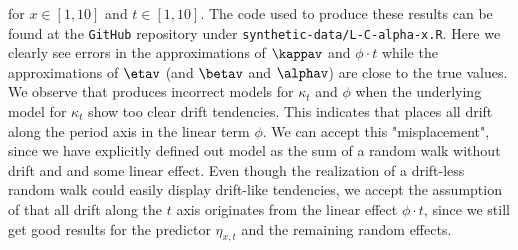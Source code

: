 for $x\in[1,10]$ and $t\in[1,10]$. The code used to produce these results can be found at the \texttt{GitHub} repository under \texttt{synthetic-data/L-C-alpha-x.R}. Here we clearly see errors in the approximations of $\kappav$ and $\phi\cdot t$ while the approximations of $\etav$ (and $\betav$ and $\alphav$) are close to the true values. We observe that \inlabru produces incorrect models for $\kappa_t$ and $\phi$ when the underlying model for $\kappa_t$ show too clear drift tendencies. This indicates that \inlabru places all drift along the period axis in the linear term $\phi$. We can accept this "misplacement", since we have explicitly defined out model as the sum of a random walk without drift and and some linear effect. Even though the realization of a drift-less random walk could easily display drift-like tendencies, we accept the assumption of \inlabru that all drift along the $t$ axis originates from the linear effect $\phi \cdot t$, since we still get good results for the predictor $\eta_{x,t}$ and the remaining random effects.
\newline
